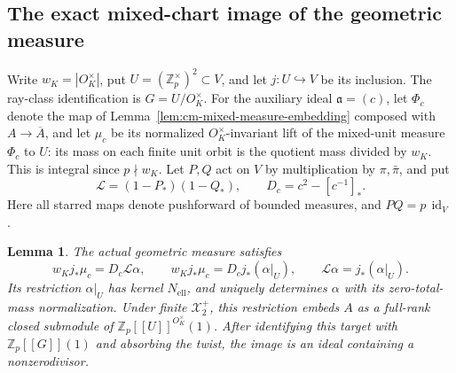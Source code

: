 \documentclass[11pt]{article}
\newtheorem{lemma}[theorem]{Lemma}
\theoremstyle{definition}\newtheorem{definition}[theorem]{Definition}
\begin{document}
\subsection{The exact mixed-chart image of the geometric measure}
\label{subsec:cm-measure-image}

Write \(w_K=|O_K^\times|\), put \(U=(\mathbb Z_p^\times)^2\subset V\), and let
\(j:U\hookrightarrow V\) be its inclusion.
The ray-class identification is
\(G=U/O_K^\times\).  For the auxiliary ideal
\(\mathfrak a=(c)\), let \(\Phi_c\) denote the map of Lemma~\ref{lem:cm-mixed-measure-embedding} composed with \(A\to\overline A\), and let \(\mu_c\) be its normalized
\(O_K^\times\)-invariant lift of the mixed-unit
measure \(\Phi_c\) to \(U\): its mass on each finite
unit orbit is the quotient mass divided by \(w_K\).
This is integral since \(p\nmid w_K\).
Let \(P,Q\) act on \(V\) by multiplication by
\(\pi,\bar\pi\), and put
\[
 \mathcal L=(1-P_*)(1-Q_*),\qquad
 D_c=c^2-[c^{-1}]_*.
\]
Here all starred maps denote pushforward of bounded
measures, and \(PQ=p\,\operatorname{id}_V\).

\begin{lemma}\label{lem:cm-measure-euler-image}
The actual geometric measure satisfies
\[
 w_Kj_*\mu_c=D_c\mathcal L\alpha,\qquad
 w_Kj_*\mu_c=D_cj_*(\alpha|_U),\qquad
 \mathcal L\alpha=j_*(\alpha|_U).
\]
Its restriction \(\alpha|_U\) has kernel
\(N_{\mathrm{ell}}\), and uniquely determines
\(\alpha\) with its zero-total-mass normalization.
Under finite \(\mathcal X_2^+\), this restriction
embeds \(A\) as a full-rank closed submodule of
\(\mathbb Z_p[[U]]^{O_K^\times}(1)\).
After identifying this target with
\(\mathbb Z_p[[G]](1)\) and absorbing the twist,
the image is an ideal containing a nonzerodivisor.
\end{lemma}
\end{document}
